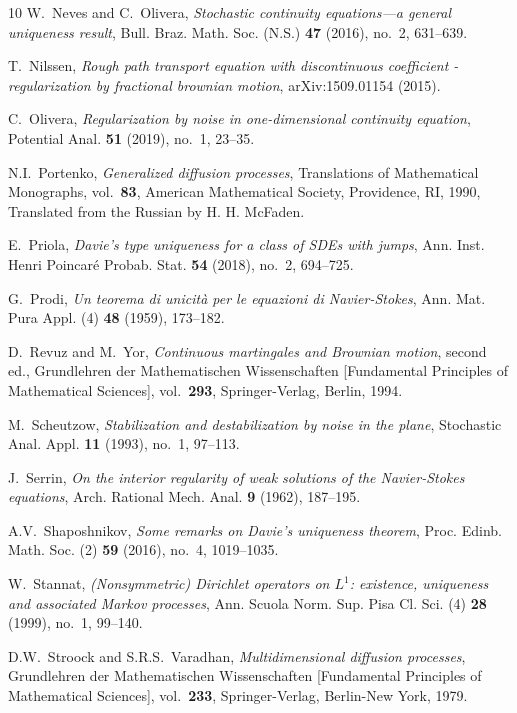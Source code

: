\documentclass[a4paper,10pt]{article}
\newcommand\1{\mathbbm{1}}
\numberwithin{equation}{section}
\begin{document}
\begin{thebibliography}{10}
W.~Neves and C.~Olivera, \emph{Stochastic continuity equations---a general uniqueness result}, Bull. Braz. Math. Soc. (N.S.) \textbf{47} (2016), no.~2, 631--639.

T.~Nilssen, \emph{Rough path transport equation with discontinuous coefficient - regularization by fractional brownian motion}, arXiv:1509.01154 (2015).

C.~Olivera, \emph{Regularization by noise in one-dimensional continuity
  equation}, Potential Anal. \textbf{51} (2019), no.~1, 23--35.

N.I.~Portenko, \emph{Generalized diffusion processes}, Translations of
  Mathematical Monographs, vol.~{\bf 83}, American Mathematical Society,
  Providence, RI, 1990, Translated from the Russian by H. H. McFaden.

E.~Priola, \emph{Davie's type uniqueness for a class of {SDE}s with jumps},
  Ann. Inst. Henri Poincar\'{e} Probab. Stat. \textbf{54} (2018), no.~2, 694--725.

G.~Prodi, \emph{Un teorema di unicit\`a per le equazioni di {N}avier-{S}tokes}, Ann. Mat. Pura Appl. (4) \textbf{48} (1959), 173--182.

D.~Revuz and M.~Yor, \emph{Continuous martingales and {B}rownian motion},
  second ed., Grundlehren der Mathematischen Wissenschaften [Fundamental
  Principles of Mathematical Sciences], vol.~\textbf{293}, Springer-Verlag, Berlin, 1994.

M.~Scheutzow, \emph{Stabilization and destabilization by noise in the plane}, Stochastic Anal. Appl. \textbf{11} (1993), no.~1, 97--113.  
  
J.~Serrin, \emph{On the interior regularity of weak solutions of the
  {N}avier-{S}tokes equations}, Arch. Rational Mech. Anal. \textbf{9}
  (1962), 187--195.

A.V.~Shaposhnikov, \emph{Some remarks on {D}avie's uniqueness theorem}, Proc. Edinb. Math. Soc. (2) \textbf{59} (2016), no.~4, 1019--1035.

W.~Stannat, \emph{\textup{(}{N}onsymmetric\textup{)} {D}irichlet operators on {$L^1$}: existence, uniqueness and associated {M}arkov processes}, Ann. Scuola Norm. Sup. Pisa Cl. Sci. (4) \textbf{28} (1999), no.~1, 99--140.

D.W.~Stroock and S.R.S.~Varadhan, \emph{Multidimensional diffusion processes}, Grundlehren der Mathematischen Wissenschaften [Fundamental Principles of Mathematical Sciences], vol.~\textbf{233}, Springer-Verlag, Berlin-New York, 1979.


\end{thebibliography}
\end{document}
